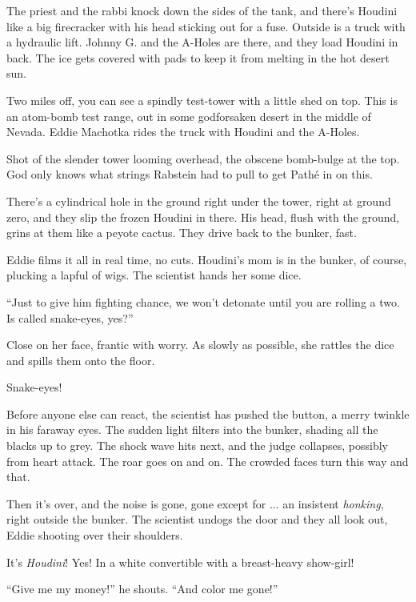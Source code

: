The priest and the rabbi knock down the sides of the tank, and there's Houdini like a big firecracker with his head sticking out for a fuse. Outside is a truck with a hydraulic lift. Johnny G. and the A-Holes are there, and they load Houdini in back. The ice gets covered with pads to keep it from melting in the hot desert sun.

Two miles off, you can see a spindly test-tower with a little shed on top. This is an atom-bomb test range, out in some godforsaken desert in the middle of Nevada. Eddie Machotka rides the truck with Houdini and the A-Holes.

Shot of the slender tower looming overhead, the obscene bomb-bulge at the top. God only knows what strings Rabstein had to pull to get Pathé in on this.

There's a cylindrical hole in the ground right under the tower, right at ground zero, and they slip the frozen Houdini in there. His head, flush with the ground, grins at them like a peyote cactus. They drive back to the bunker, fast.

Eddie films it all in real time, no cuts. Houdini's mom is in the bunker, of course, plucking a lapful of wigs. The scientist hands her some dice.

``Just to give him fighting chance, we won't detonate until you are rolling a two. Is called snake-eyes, yes?''

Close on her face, frantic with worry. As slowly as possible, she rattles the dice and spills them onto the floor.

Snake-eyes!

Before anyone else can react, the scientist has pushed the button, a merry twinkle in his faraway eyes. The sudden light filters into the bunker, shading all the blacks up to grey. The shock wave hits next, and the judge collapses, possibly from heart attack. The roar goes on and on. The crowded faces turn this way and that.

Then it's over, and the noise is gone, gone except for ... an insistent \textit{honking}, right outside the bunker. The scientist undogs the door and they all look out, Eddie shooting over their shoulders.

It's \textit{Houdini}! Yes! In a white convertible with a breast-heavy show-girl!

``Give me my money!'' he shouts. ``And color me gone!''